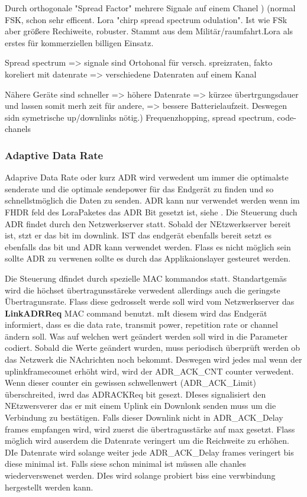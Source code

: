 \documentclass[a4paper,12pt]{article}
\begin{document}
                Durch orthogonale "Spread Factor" mehrere Signale auf einem Chanel
            )
            \cite{WhatIsLoRa}(normal FSK, schon sehr efficent. Lora "chirp spread spectrum odulation". Ist wie FSk aber größere Rechiweite, robuster. Stammt aus dem Militär/raumfahrt.Lora als erstes für kommerziellen billigen Einsatz.
            
            Spread spectrum => signale sind Ortohonal für versch. spreizraten, fakto koreliert mit datenrate => verschiedene Datenraten auf einem Kanal
            
            Nähere Geräte sind schneller => höhere Datenrate => kürzee übertrgungsdauer und lassen somit merh zeit für andere, => bessere Batterielaufzeit. Deswegen sidn symetrische up/downlinks nötig.)
            Frequenzhopping, spread spectrum, code-chanels
            \subsubsection{Adaptive Data Rate}\label{sec:ADR}
                Adaprive Data Rate oder kurz ADR wird verwedent um immer die optimalste senderate und die optimale sendepower für das Endgerät zu finden und so schnellstmöglich die Daten zu senden. ADR kann nur verwendet werden wenn im FHDR feld des LoraPaketes das ADR Bit gesetzt ist, siehe .
                Die Steuerung duch ADR findet durch den Netzwerkserver statt. Sobald der NEtzwerkserver bereit ist, stzt er das bit im downlink. IST das endgerät ebenfalls bereit setzt es ebenfalls das bit und ADR kann verwendet werden. Flass es nicht möglich sein sollte ADR zu verwenen  sollte es durch das Applikaionslayer gesteuret werden.

                Die Steuerung dfindet durch spezielle MAC kommandos statt. Standartgemäs wird die höchset übertragunsstäreke verwedent allerdings auch die geringste Übertragunsrate. Flass diese gedrosselt werde soll wird vom Netzwerkserver das \textbf{LinkADRReq} MAC command benutzt. mIt diesem wird das Endgerät informiert, dass es die data rate, transmit power, 
                repetition rate or channel ändern soll. Was auf welchen wert geändert werden soll wird in die Parameter codiert. Sobald die Werte geändert wurden, muss periodisch überprüft werden ob das Netzwerk die NAchrichten noch bekommt. Deswegen wird jedes mal wenn der uplinkframecounet  erhöht wird, wird der ADR\_ACK\_CNT counter verwedent.
                Wenn dieser counter ein gewissen schwellenwert (ADR\_ACK\_Limit) überschreited, iwrd das ADRACKReq bit gesezt. DIeses signalisiert den NEtzwersverer das er mit einem Uplink ein Downlonk senden muss um die Verbindung zu bestätigen. Falls dieser Downlink nicht in ADR\_ACK\_Delay frames empfangen wird, wird zuerst die übertragusstärke auf max gesetzt. Flass möglich wird auserdem die Datenrate veringert um die Reichweite zu erhöhen. DIe 
                Datenrate wird solange weiter jede ADR\_ACK\_Delay frames veringert bis diese minimal ist. Falls siese schon minimal ist müssen alle chanles wiederverswenet werden. DIes wird solange probiert biss eine verwbindung hergestellt werden kann.
                
\end{document}
